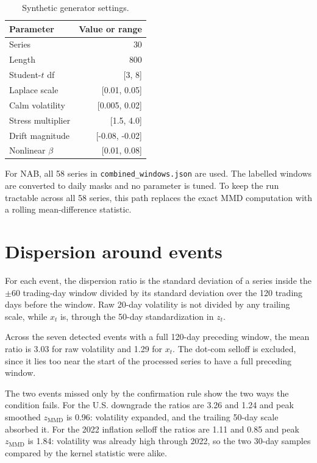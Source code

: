 \documentclass[pdflatex,sn-mathphys-num,iicol]{sn-jnl}
\begin{document}
\begin{appendices}
\begin{table}[t]
\centering
\caption{Synthetic generator settings.}
\label{tab:synthetic_params}
\scriptsize
\begin{tabular}{lr}
\toprule
Parameter & Value or range\\
\midrule
Series & 30\\
Length & 800\\
Student-$t$ df & [3, 8]\\
Laplace scale & [0.01, 0.05]\\
Calm volatility & [0.005, 0.02]\\
Stress multiplier & [1.5, 4.0]\\
Drift magnitude & [-0.08, -0.02]\\
Nonlinear $\beta$ & [0.01, 0.08]\\
\bottomrule
\end{tabular}
\end{table}

For NAB, all 58 series in \texttt{combined\_windows.json} are used. The labelled windows are converted to daily masks and no parameter is tuned. To keep the run tractable across all 58 series, this path replaces the exact MMD computation with a rolling mean-difference statistic.

\section{Dispersion around events}
\label{app:mechanism}
For each event, the dispersion ratio is the standard deviation of a series inside the $\pm60$ trading-day window divided by its standard deviation over the 120 trading days before the window. Raw 20-day volatility is not divided by any trailing scale, while $x_t$ is, through the 50-day standardization in $z_t$.

Across the seven detected events with a full 120-day preceding window, the mean ratio is 3.03 for raw volatility and 1.29 for $x_t$. The dot-com selloff is excluded, since it lies too near the start of the processed series to have a full preceding window.

The two events missed only by the confirmation rule show the two ways the condition fails. For the U.S. downgrade the ratios are 3.26 and 1.24 and peak smoothed $z_{\mathrm{MMD}}$ is 0.96: volatility expanded, and the trailing 50-day scale absorbed it. For the 2022 inflation selloff the ratios are 1.11 and 0.85 and peak $z_{\mathrm{MMD}}$ is 1.84: volatility was already high through 2022, so the two 30-day samples compared by the kernel statistic were alike.

\end{appendices}


\end{document}
